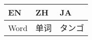 \documentclass[10pt]{article} %
\begin{document}

    \begin{longtable}{@{}p{}%
                       p{}%
                       p{}@{}}
    
    \toprule %
    EN & ZH & JA \\ \midrule
    \endhead %
    
    \midrule
    \endfoot %
    
    \bottomrule
    \endlastfoot %
    
    Word & 单词 & タンゴ \\ \midrule
    
    \end{longtable}
    


\end{document}
